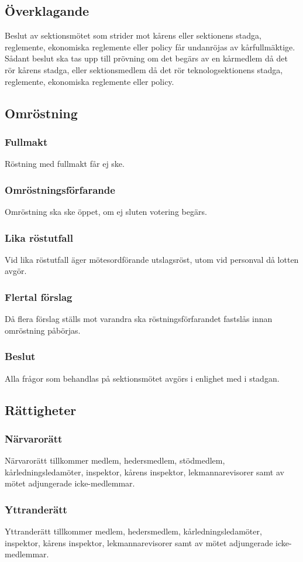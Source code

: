 \subsection{Överklagande}
Beslut av sektionsmötet som strider mot kårens eller sektionens stadga, reglemente, ekonomiska reglemente eller policy får undanröjas av kårfullmäktige. Sådant beslut ska tas upp till prövning om det begärs av en kårmedlem då det rör kårens stadga, eller sektionsmedlem då det rör teknologsektionens stadga, reglemente, ekonomiska reglemente eller policy.
\subsection{Omröstning}
\subsubsection{Fullmakt}
Röstning med fullmakt får ej ske.
\subsubsection{Omröstningsförfarande}
Omröstning ska ske öppet, om ej sluten votering begärs.
\subsubsection{Lika röstutfall}
Vid lika röstutfall äger mötesordförande utslagsröst, utom vid personval då lotten avgör.
\subsubsection{Flertal förslag}
Då flera förslag ställs mot varandra ska röstningsförfarandet fastslås innan omröstning påbörjas.
\subsubsection{Beslut}
Alla frågor som behandlas på sektionsmötet avgörs i enlighet med  i stadgan.
\subsection{Rättigheter}
\subsubsection{Närvarorätt}
Närvarorätt tillkommer medlem, hedersmedlem, stödmedlem, kårledningsledamöter, inspektor, kårens inspektor, lekmannarevisorer samt av mötet adjungerade icke-medlemmar.
\subsubsection{Yttranderätt}
Yttranderätt tillkommer medlem, hedersmedlem, kårledningsledamöter, inspektor, kårens inspektor, lekmannarevisorer samt av mötet adjungerade icke-medlemmar.
